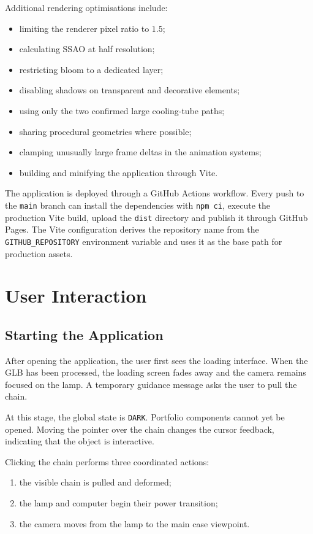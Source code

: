 \documentclass{report}
\begin{document}
Additional rendering optimisations include:

\begin{itemize}
    \item limiting the renderer pixel ratio to \(1.5\);
    \item calculating SSAO at half resolution;
    \item restricting bloom to a dedicated layer;
    \item disabling shadows on transparent and decorative elements;
    \item using only the two confirmed large cooling-tube paths;
    \item sharing procedural geometries where possible;
    \item clamping unusually large frame deltas in the animation systems;
    \item building and minifying the application through Vite.
\end{itemize}

The application is deployed through a GitHub Actions workflow. Every
push to the \texttt{main} branch can install the dependencies with
\texttt{npm ci}, execute the production Vite build, upload the
\texttt{dist} directory and publish it through GitHub Pages. The Vite
configuration derives the repository name from the
\texttt{GITHUB\_REPOSITORY} environment variable and uses it as the base
path for production assets.

\section{User Interaction}

\subsection{Starting the Application}

After opening the application, the user first sees the loading interface.
When the GLB has been processed, the loading screen fades away and the
camera remains focused on the lamp. A temporary guidance message asks
the user to pull the chain.

At this stage, the global state is \texttt{DARK}. Portfolio components
cannot yet be opened. Moving the pointer over the chain changes the
cursor feedback, indicating that the object is interactive.

Clicking the chain performs three coordinated actions:

\begin{enumerate}
    \item the visible chain is pulled and deformed;
    \item the lamp and computer begin their power transition;
    \item the camera moves from the lamp to the main case viewpoint.
\end{enumerate}
\end{document}
